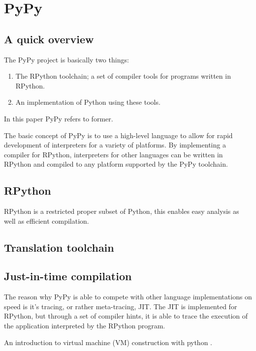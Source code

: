 \section{PyPy}

\subsection{A quick overview}

The PyPy project is basically two things:

\begin{enumerate}

\item The RPython toolchain; a set of compiler tools for programs written in 
RPython.

\item An implementation of Python using these tools.

\end{enumerate}

In this paper PyPy refers to former.

The basic concept of PyPy is to use a high-level language to allow for rapid
development of interpreters for a variety of platforms. By implementing a compiler
for RPython, interpreters for other languages can be written in RPython and 
compiled to any platform supported by the PyPy toolchain.

\subsection{RPython}

RPython is a restricted proper subset of Python, this enables easy analysis 
as well as efficient compilation.

\subsection{Translation toolchain}


\subsection{Just-in-time compilation}

The reason why PyPy is able to compete with other language implementations
on speed is it's tracing, or rather meta-tracing, JIT. The JIT is implemented
for RPython, but through a set of compiler hints, it is able to trace the 
execution of the application interpreted by the RPython program.

An introduction to virtual machine (VM) construction with python \cite{pypy}.

